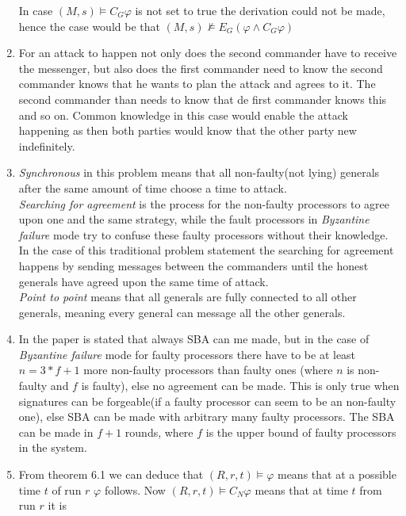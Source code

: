 \documentclass[12pt]{article} %
\begin{document}
\begin{enumerate}
        In case $(M,s) \models C_G\varphi$ is not set to true the derivation
        could not be made, hence the case would be that $(M,s) \nvDash
        E_G(\varphi \wedge C_G\varphi)$
    \item
        For an attack to happen not only does the second commander have to receive the
        messenger, but also does the first commander need to know the second
        commander knows that he wants to plan the attack and agrees to it. The
        second commander than needs to know that de first commander knows this
        and so on. Common knowledge in this case would enable the attack
        happening as then both parties would know that the other party new
        indefinitely.
    \item \emph{Synchronous} in this problem means that all non-faulty(not
        lying) generals after the same amount of time choose a time to attack.\\
        \emph{Searching for agreement} is the process for the non-faulty
        processors to agree upon one and the same strategy, while the fault
        processors in \emph{Byzantine failure} mode try to confuse these faulty
        processors without their knowledge. In the case of this
        traditional problem statement the searching for agreement happens by
        sending messages between the commanders until the honest generals have
        agreed upon the same time of attack.\\
        \emph{Point to point} means that all generals are fully connected to all
        other generals, meaning every general can message all the other
        generals.
    \item In the paper is stated that always SBA can me made, but in the case of \emph{Byzantine failure}
        mode for faulty processors there have to be at least $n = 3*f + 1$ more
        non-faulty processors than faulty ones (where $n$ is non-faulty and
        $f$ is
        faulty), else no agreement can be made. This is only true when
        signatures can be forgeable(if a faulty processor can seem to be an
        non-faulty one), else SBA can be made with arbitrary many
        faulty processors. The SBA can be made in $f + 1$ rounds, where $f$ is the
        upper bound of faulty processors in the system.
    \item From theorem 6.1 we can deduce that $(R, r, t) \models \varphi$ means
        that at a possible time $t$ of run $r$ $\varphi$ follows. Now
        $(R, r, t) \models  C_N\varphi$ means that at time $t$ from run $r$ it is

\end{enumerate}
\end{document}
